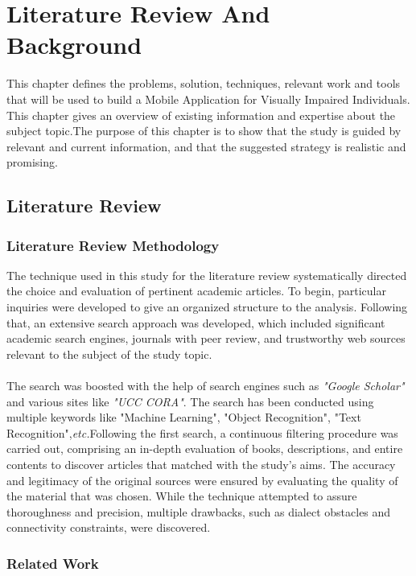 \documentclass[MScCS]{uccthesis}
\begin{document}
   
\chapter{Literature Review And Background}
This chapter defines the problems, solution, techniques, relevant work and tools that will be used to build a Mobile Application for Visually Impaired Individuals. This chapter gives an overview of existing information and expertise about the subject topic.The purpose of this chapter is to show that the study is guided by relevant and current information, and that the suggested strategy is realistic and promising.
\section{Literature Review}
\subsection{Literature Review Methodology}
The technique used in this study for the literature review systematically directed the choice and evaluation of pertinent academic articles. To begin, particular inquiries were developed to give an organized structure to the analysis. Following that, an extensive search approach was developed, which included significant academic search engines, journals with peer review, and trustworthy web sources relevant to the subject of the study topic.\\
\\
The search was boosted with the help of search engines such as \textit{"Google Scholar"} and various sites like \textit{"UCC CORA"}. The search has been conducted using multiple keywords like "Machine Learning", "Object Recognition", "Text Recognition",\textit{etc.}Following the first search, a continuous filtering procedure was carried out, comprising an in-depth evaluation of books, descriptions, and entire contents to discover articles that matched with the study's aims.  The accuracy and legitimacy of the original sources were ensured by evaluating the quality of the material that was chosen. While the technique attempted to assure thoroughness and precision, multiple drawbacks, such as dialect obstacles and connectivity constraints, were discovered. 

\subsection{Related Work}
\end{document}
